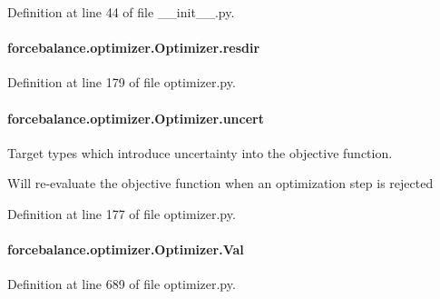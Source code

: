 Definition at line 44 of file \-\_\-\-\_\-init\-\_\-\-\_\-.\-py.

\hypertarget{classforcebalance_1_1optimizer_1_1Optimizer_a5b4723583be79d1387d7d77d07bab150}{
\paragraph[{resdir}]{\setlength{\rightskip}{0pt plus 5cm}forcebalance.\-optimizer.\-Optimizer.\-resdir}}\label{classforcebalance_1_1optimizer_1_1Optimizer_a5b4723583be79d1387d7d77d07bab150}


Definition at line 179 of file optimizer.\-py.

\hypertarget{classforcebalance_1_1optimizer_1_1Optimizer_ae52c7b868b40920a62001e30ea1e8202}{
\paragraph[{uncert}]{\setlength{\rightskip}{0pt plus 5cm}forcebalance.\-optimizer.\-Optimizer.\-uncert}}\label{classforcebalance_1_1optimizer_1_1Optimizer_ae52c7b868b40920a62001e30ea1e8202}


Target types which introduce uncertainty into the objective function. 

Will re-\/evaluate the objective function when an optimization step is rejected 

Definition at line 177 of file optimizer.\-py.

\hypertarget{classforcebalance_1_1optimizer_1_1Optimizer_a2577b97a9ee5f3fcd4aa108a2baafc04}{
\paragraph[{Val}]{\setlength{\rightskip}{0pt plus 5cm}forcebalance.\-optimizer.\-Optimizer.\-Val}}\label{classforcebalance_1_1optimizer_1_1Optimizer_a2577b97a9ee5f3fcd4aa108a2baafc04}


Definition at line 689 of file optimizer.\-py.

